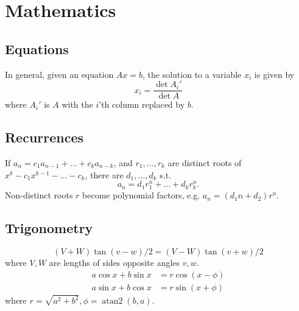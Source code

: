 
\chapter{Mathematics}

\section{Equations}
% 
% 
In general, given an equation $Ax = b$, the solution to a variable $x_i$ is given by
\[x_i = \frac{\det A_i'}{\det A} \]
where $A_i'$ is $A$ with the $i$'th column replaced by $b$.

\section{Recurrences}
If $a_n = c_1 a_{n-1} + \dots + c_k a_{n-k}$, and $r_1, \dots, r_k$ are distinct roots of $x^k - c_1 x^{k-1} - \dots - c_k$, there are $d_1, \dots, d_k$ s.t.
\[a_n = d_1r_1^n + \dots + d_kr_k^n. \]
Non-distinct roots $r$ become polynomial factors, e.g. $a_n = (d_1n + d_2)r^n$.

\section{Trigonometry}
\[ (V+W)\tan(v-w)/2{}=(V-W)\tan(v+w)/2 \]
where $V, W$ are lengths of sides opposite angles $v, w$.
\begin{align*}
	a\cos x+b\sin x&=r\cos(x-\phi)\\
	a\sin x+b\cos x&=r\sin(x+\phi)
\end{align*}
where $r=\sqrt{a^2+b^2}, \phi=\operatorname{atan2}(b,a)$.

